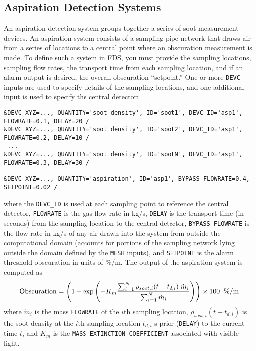 \documentclass[11pt]{book}
\newcommand{\ct}{\tt\small}
\newcommand{\dm}{\dot{m}}
\newcommand{\be}{\begin{equation}}
\newcommand{\ee}{\end{equation}}
\begin{document}
\subsection{Aspiration Detection Systems}
\label{info:aspiration_detector}

An aspiration detection system groups together a series of soot measurement devices.
An aspiration system consists of a sampling pipe network that draws air from a series of locations to a central point
where an obscuration measurement is made.  To define such a system in FDS, you must provide the sampling locations,
sampling flow rates, the transport time from each sampling location, and if an alarm output is desired, the overall obscuration
``setpoint.''  One or more {\ct DEVC} inputs are used to specify details of the sampling locations, and one additional input is
used to specify the central detector:

\footnotesize
\begin{verbatim}
&DEVC XYZ=..., QUANTITY='soot density', ID='soot1', DEVC_ID='asp1', FLOWRATE=0.1, DELAY=20 /
&DEVC XYZ=..., QUANTITY='soot density', ID='soot2', DEVC_ID='asp1', FLOWRATE=0.2, DELAY=10 /
 ...
&DEVC XYZ=..., QUANTITY='soot density', ID='sootN', DEVC_ID='asp1', FLOWRATE=0.3, DELAY=30 /

&DEVC XYZ=..., QUANTITY='aspiration', ID='asp1', BYPASS_FLOWRATE=0.4, SETPOINT=0.02 /
\end{verbatim}
\normalsize

\noindent
where the {\ct DEVC\_ID} is used at each sampling point to reference the central detector, {\ct FLOWRATE} is the gas
flow rate in kg/s, {\ct DELAY} is the transport time (in seconds) from the sampling location to the central detector,
{\ct BYPASS\_FLOWRATE} is the flow rate in kg/s of any air drawn into the system from outside the computational
domain (accounts for portions of the sampling network lying outside the domain defined by the {\ct MESH}
inputs), and {\ct SETPOINT} is the alarm threshold obscuration in units of \%/m. The output of the aspiration system is
computed as
\be
  \hbox{Obscuration}  = \left(1 - \exp \left( -K_m \frac {\sum_{i=1}^N {\rho_{soot,i}( t-t_{d,i}) \; \dm_i}} {\sum_{i=1}^N{ \dm_i} } \right)  \right) \times 100  \; \; \hbox{\%/m}
\ee
where $\dm_i$ is the mass {\ct FLOWRATE} of the $i$th sampling location, $\rho_{soot,i}( t-t_{d,i})$ is the soot density at
the $i$th sampling location $t_{d,i}$ s prior ({\ct DELAY}) to the current time $t$, and $K_m$ is the {\ct MASS\_EXTINCTION\_COEFFICIENT} associated with visible light.
\end{document}
